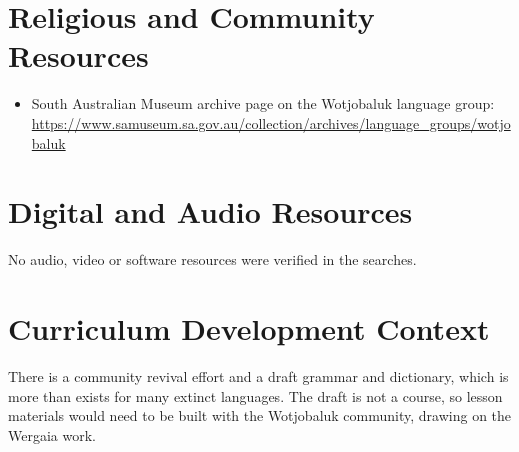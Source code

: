 \documentclass[12pt]{article}
\begin{document}
\section{Religious and Community Resources}
\begin{itemize}
\item South Australian Museum archive page on the Wotjobaluk language group: \url{https://www.samuseum.sa.gov.au/collection/archives/language_groups/wotjobaluk}
\end{itemize}

\section{Digital and Audio Resources}
No audio, video or software resources were verified in the searches.

\section{Curriculum Development Context}
There is a community revival effort and a draft grammar and dictionary, which is more than exists for many extinct languages. The draft is not a course, so lesson materials would need to be built with the Wotjobaluk community, drawing on the Wergaia work.
\end{document}
